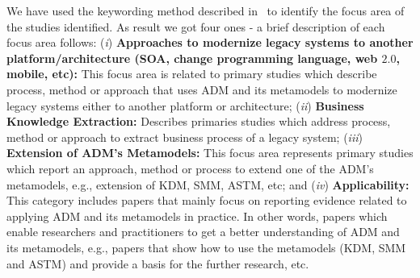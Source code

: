We have used the keywording method described in~\cite{Petersen:2008:SMS:2227115.2227123} to identify the focus area of the studies identified. As result we got four ones - a brief description of each focus area follows: (\textit{i}) \textbf{Approaches to modernize legacy systems to another platform/architecture (SOA, change programming language, web $2.0$, mobile, etc):} This focus area is related to primary studies which describe process, method or approach that uses ADM and its metamodels to modernize legacy systems either to another platform  or architecture; (\textit{ii}) \textbf{Business Knowledge Extraction:} Describes primaries studies which address process, method or approach to extract business process of a legacy system; (\textit{iii}) \textbf{Extension of ADM's Metamodels:} This focus area represents primary studies which report an approach, method or process to extend one of the ADM's metamodels, e.g., extension of KDM, SMM, ASTM, etc; and (\textit{iv}) \textbf{Applicability:} This category includes papers that mainly focus on reporting evidence related to applying ADM and its metamodels in practice. In other words, papers which enable researchers and practitioners to get a better understanding of ADM and its metamodels, e.g., papers that show how to use the metamodels (KDM, SMM and ASTM) and provide a basis for the further research, etc.






